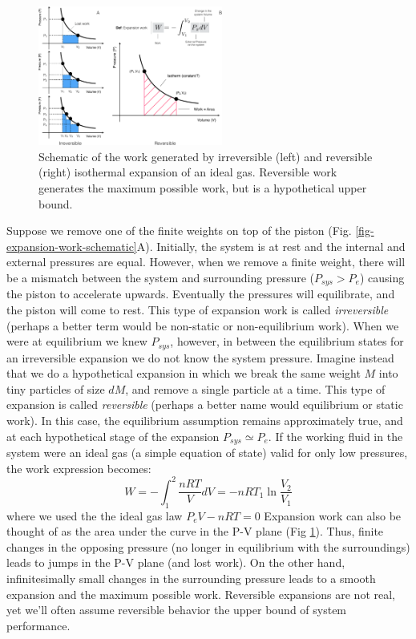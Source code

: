 \documentclass[11pt]{article}
\theoremstyle{definition}
\begin{document}
\begin{figure}
\includegraphics[width=0.54\textwidth]{./figs/WorkArea.pdf}
\caption{Schematic of the work generated by irreversible (left) and reversible (right) isothermal expansion of an ideal gas.
Reversible work generates the maximum possible work, but is a hypothetical upper bound.}\label{fig-expansion-work-area}
\end{figure}

Suppose we remove one of the finite weights on top of the piston (Fig. \ref{fig-expansion-work-schematic}A).
Initially, the system is at rest and the internal and external pressures are equal.
However, when we remove a finite weight, there will be a mismatch between the system and surrounding pressure ($P_{sys}>P_{e}$)
causing the piston to accelerate upwards. Eventually the pressures will equilibrate, and the piston will come to rest.
This type of expansion work is called \textit{irreversible} (perhaps a better term would be non-static or non-equilibrium work).
When we were at equilibrium we knew $P_{sys}$, however, in between the equilibrium states for an irreversible expansion we do not know the system pressure.
Imagine instead that we do a hypothetical expansion in which we break the same weight $M$ into tiny particles of size $dM$, and remove a single particle at a time.
This type of expansion is called \textit{reversible} (perhaps a better name would equilibrium or static work).
In this case, the equilibrium assumption remains approximately true, and at each hypothetical stage of the expansion $P_{sys}\simeq P_{e}$.
If the working fluid in the system were an ideal gas (a simple equation of state) valid for only low pressures, the work expression becomes:
\begin{equation}\label{eqn:isothermal-reversible-expansion}
W = - \int_{1}^{2} \frac{nRT}{V}dV = - nRT_{1}\ln\frac{V_{2}}{V_{1}}
\end{equation}where we used the the ideal gas law $P_{e}V - nRT = 0$
Expansion work can also be thought of as the area under the curve in the P-V plane (Fig \ref{fig-expansion-work-area}).
Thus, finite changes in the opposing pressure (no longer in equilibrium with the surroundings) leads to jumps in the P-V plane (and lost work).
On the other hand, infinitesimally small changes in the surrounding pressure leads to a smooth expansion and the maximum possible work.
Reversible expansions are not real, yet we'll often assume reversible behavior the upper bound of system performance.
\end{document}
